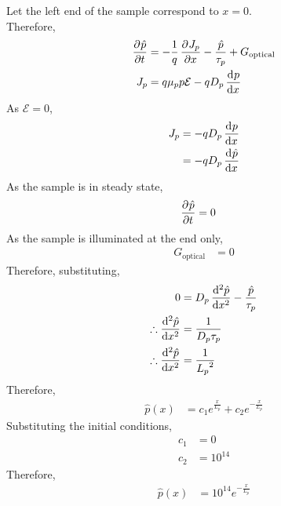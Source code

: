 \documentclass[titlepage, fleqn, a4paper, 12pt, twoside]{article}
\theoremstyle{definition}
\theoremstyle{theorem}
\begin{document}
\begin{solution}
	Let the left end of the sample correspond to $x = 0$.\\
	Therefore,
	\begin{align*}
		\dpd{\hat{p}}{t} &= -\frac{1}{q} \dpd{J_p}{x} - \frac{\hat{p}}{\tau_p} + G_{\text{optical}}\\
		J_p &= q \mu_p p \mathcal{E} - q D_p \dod{p}{x}
	\end{align*}
	As $\mathcal{E} = 0$,
	\begin{align*}
		J_p &= -q D_p \dod{p}{x}\\
		&= -q D_p \dod{\hat{p}}{x}
	\end{align*}
	As the sample is in steady state,
	\begin{align*}
		\dpd{\hat{p}}{t} &= 0
	\end{align*}
	As the sample is illuminated at the end only,
	\begin{align*}
		G_{\text{optical}} &= 0
	\end{align*}
	Therefore, substituting,
	\begin{align*}
		0 &= D_p \dod[2]{\hat{p}}{x} - \frac{\hat{p}}{\tau_p}\\
		\therefore \dod[2]{\hat{p}}{x} &= \frac{1}{D_p \tau_p}\\
		\therefore \dod[2]{\hat{p}}{x} &= \frac{1}{{L_p}^2}\\
	\end{align*}
	Therefore,
	\begin{align*}
		\hat{p}(x) &= c_1 e^{\frac{x}{L_p}} + c_2 e^{-\frac{x}{L_p}}
	\end{align*}
	Substituting the initial conditions,
	\begin{align*}
		c_1 &= 0\\
		c_2 &= 10^{14}
	\end{align*}
	Therefore,
	\begin{align*}
		\hat{p}(x) &= 10^{14} e^{-\frac{x}{L_p}}
	\end{align*}
\end{solution}
\end{document}
